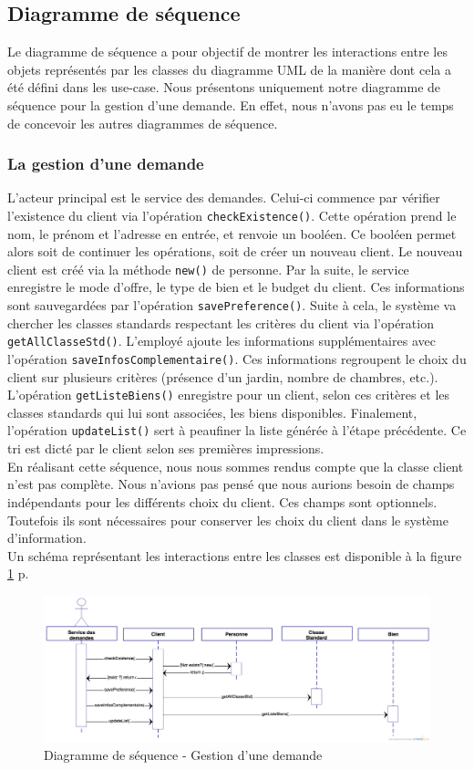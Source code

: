 \subsection{Diagramme de séquence}
Le diagramme de séquence a pour objectif de montrer les interactions entre les objets représentés par les classes du diagramme UML de la manière dont cela a été défini dans les use-case.
Nous présentons uniquement notre diagramme de séquence pour la gestion d'une demande.
En effet, nous n'avons pas eu le temps de concevoir les autres diagrammes de séquence.

\subsubsection{La gestion d'une demande}
L'acteur principal est le service des demandes. 
Celui-ci commence par vérifier l'existence du client via l'opération \texttt{checkExistence()}.
Cette opération prend le nom, le prénom et l'adresse en entrée, et renvoie un booléen.
Ce booléen permet alors soit de continuer les opérations, soit de créer un nouveau client.
Le nouveau client est créé via la méthode \texttt{new()} de personne.
Par la suite, le service enregistre le mode d'offre, le type de bien et le budget du client.
Ces informations sont sauvegardées par l'opération \texttt{savePreference()}.
Suite à cela, le système va chercher les classes standards respectant les critères du client via l'opération \texttt{getAllClasseStd()}.
L'employé ajoute les informations supplémentaires avec l'opération \texttt{saveInfosComplementaire()}.
Ces informations regroupent le choix du client sur plusieurs critères (présence d'un jardin, nombre de chambres, etc.).
L'opération \texttt{getListeBiens()} enregistre pour un client, selon ces critères et les classes standards qui lui sont associées, les biens disponibles.
Finalement, l'opération \texttt{updateList()} sert à peaufiner la liste générée à l'étape précédente.
Ce tri est dicté par le client selon ses premières impressions.\\

En réalisant cette séquence, nous nous sommes rendus compte que la classe client n'est pas complète. Nous n'avions pas pensé que nous aurions besoin de champs indépendants pour les différents choix du client. Ces champs sont optionnels. Toutefois ils sont nécessaires pour conserver les choix du client dans le système d'information.\\

Un schéma représentant les interactions entre les classes est disponible à la figure \ref{fig:sequence} p.\pageref{fig:sequence}

\newpage
\begin{landscape}
	\begin{figure}
		\centering
		\includegraphics[width=23cm]{Sequence-DemandeBien.png}
		\caption{Diagramme de séquence - Gestion d'une demande}
		\label{fig:sequence}
	\end{figure}	 
\end{landscape}